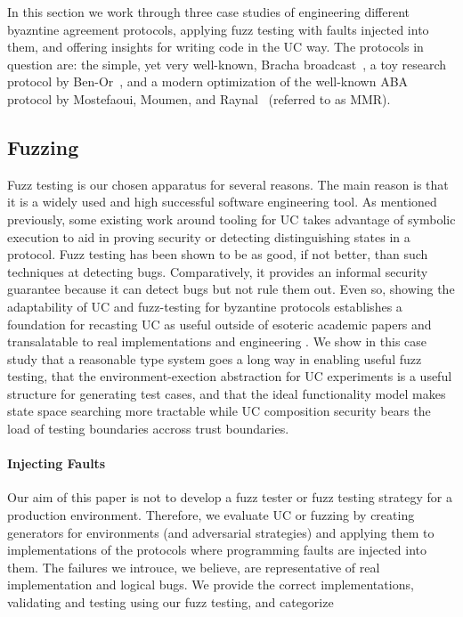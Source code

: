 In this section we work through three case studies of engineering different byazntine agreement protocols, applying fuzz testing with faults injected into them, and offering insights for writing code in the UC way.
The protocols in question are: the simple, yet very well-known, Bracha broadcast~\cite{bracha}, a toy research protocol by Ben-Or~\cite{benor}, and a modern optimization of the well-known ABA protocol by Mostefaoui, Moumen, and Raynal~\cite{mmr,aba} (referred to as MMR).

\subsection{Fuzzing}
Fuzz testing is our chosen apparatus for several reasons. The main reason is that it is a widely used and high successful software engineering tool.
As mentioned previously, some existing work around tooling for UC takes advantage of symbolic execution to aid in proving security or detecting distinguishing states in a protocol.
Fuzz testing has been shown to be as good, if not better, than such techniques at detecting bugs.
Comparatively, it provides an informal security guarantee because it can detect bugs but not rule them out.
Even so, showing the adaptability of UC and fuzz-testing for byzantine protocols establishes a foundation for recasting UC as useful outside of esoteric academic papers and transalatable to real implementations and engineering .
We show in this case study that a reasonable type system goes a long way in enabling useful fuzz testing, that the environment-exection abstraction for UC experiments is a useful structure for generating test cases, and that the ideal functionality model makes state space searching more tractable while UC composition security bears the load of testing boundaries accross trust boundaries.

\paragraph{Injecting Faults}
Our aim of this paper is not to develop a fuzz tester or fuzz testing strategy for a production environment. 
Therefore, we evaluate UC or fuzzing by creating generators for environments (and adversarial strategies) and applying them to implementations of the protocols where programming faults are injected into them.
The failures we introuce, we believe, are representative of real implementation and logical bugs. 
We provide the correct implementations, validating and testing using our fuzz testing, and categorize 
